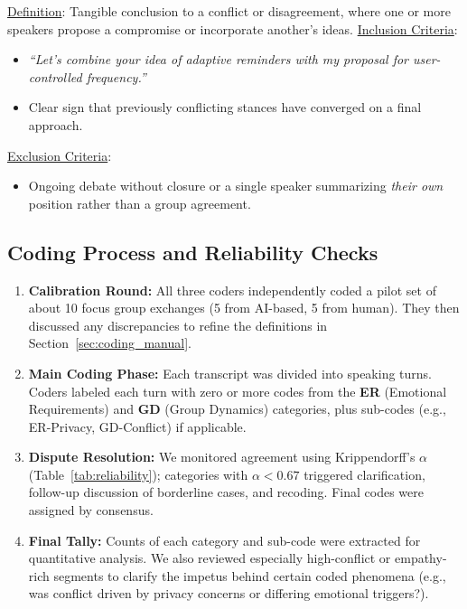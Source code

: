 \documentclass[acmsmall]{acmart}
\begin{document}
\begin{description}[leftmargin=1.2em,labelsep=0.6em]
\item[\textbf{GD-Resolution}]
\underline{Definition}: Tangible conclusion to a conflict or disagreement, where one or more speakers propose a compromise or incorporate another’s ideas.
\newline
\underline{Inclusion Criteria}:
\begin{itemize}
  \item \emph{“Let’s combine your idea of adaptive reminders with my proposal for user-controlled frequency.”}
  \item Clear sign that previously conflicting stances have converged on a final approach.
\end{itemize}
\underline{Exclusion Criteria}:
\begin{itemize}
  \item Ongoing debate without closure or a single speaker summarizing \emph{their own} position rather than a group agreement.
\end{itemize}

\end{description}

\subsection{Coding Process and Reliability Checks}

\begin{enumerate}
\item \textbf{Calibration Round:}
All three coders independently coded a pilot set of about 10 focus group exchanges (5 from AI-based, 5 from human). 
They then discussed any discrepancies to refine the definitions in Section~\ref{sec:coding_manual}.

\item \textbf{Main Coding Phase:}
Each transcript was divided into speaking turns. Coders labeled each turn with zero or more codes from the \textbf{ER} (Emotional Requirements) and \textbf{GD} (Group Dynamics) categories, plus sub-codes (e.g., ER-Privacy, GD-Conflict) if applicable.

\item \textbf{Dispute Resolution:}
We monitored agreement using Krippendorff’s $\alpha$ (Table~\ref{tab:reliability}); categories with $\alpha < 0.67$ triggered clarification, follow-up discussion of borderline cases, and recoding. Final codes were assigned by consensus.

\item \textbf{Final Tally:}
Counts of each category and sub-code were extracted for quantitative analysis. We also reviewed especially high-conflict or empathy-rich segments to clarify the impetus behind certain coded phenomena (e.g., was conflict driven by privacy concerns or differing emotional triggers?).
\end{enumerate}
\end{document}
